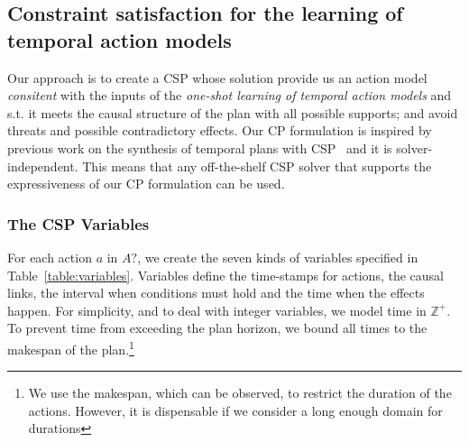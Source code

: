 \documentclass{ecai}
\begin{document}
\subsection{Constraint satisfaction for the learning of temporal action models}
\label{subsec:CPformulation}

Our approach is to create a CSP whose solution provide us an action model {\em consitent} with the inputs of the {\em one-shot learning of temporal action models} and s.t. it meets the causal structure of the plan with all possible supports; and avoid threats and possible contradictory effects. Our CP formulation is inspired by previous work on the synthesis of temporal plans with CSP~\cite{garrido2009constraint} and it is solver-independent. This means that any off-the-shelf CSP solver that supports the expressiveness of our CP formulation can be used.

\subsubsection{The CSP Variables}
For each action $a$ in $A?$, we create the seven kinds of variables specified in Table~\ref{table:variables}. Variables define the time-stamps for actions, the causal links, the interval when conditions must hold and the time when the effects happen. For simplicity, and to deal with integer variables, we model time in $\mathbb{Z}^+$. To prevent time from exceeding the plan horizon, we bound all times to the makespan of the plan.\footnote{We use the makespan, which can be observed, to restrict the duration of the actions. However, it is dispensable if we consider a long enough domain for durations}
\end{document}
